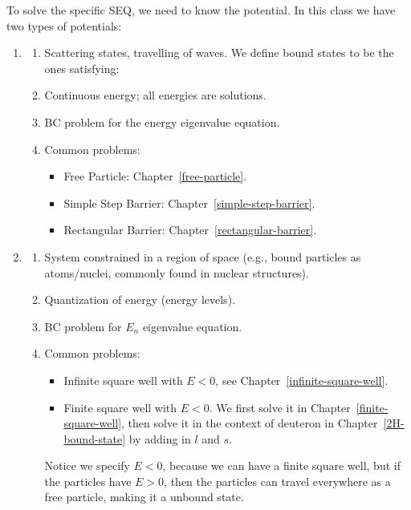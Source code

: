 \documentclass{school-22.101-notes}
\begin{document}
\clearpage
{}
To solve the specific SEQ, we need to know the potential. In this class we have two types of potentials:
\begin{enumerate}
\item {}
  \begin{enumerate}
  \item Scattering states, travelling of waves.  We define bound states to be the ones satisfying:
  \item Continuous energy; all energies are solutions. 
  \item BC problem for the energy eigenvalue equation. 
  \item Common problems:
    \begin{itemize}
    \item Free Particle: Chapter~\ref{free-particle}.
    \item Simple Step Barrier: Chapter~\ref{simple-step-barrier}.
    \item Rectangular Barrier: Chapter~\ref{rectangular-barrier}.
    \end{itemize}
  \end{enumerate}

  \item {}
    \begin{enumerate}
      \item System constrained in a region of space (e.g., bound particles as atoms/nuclei, commonly found in nuclear structures). 
      \item Quantization of energy (energy levels).
      \item BC problem for $E_n$ eigenvalue equation. 
      \item Common problems: 
        \begin{itemize}
        \item Infinite square well with $E<0$, see Chapter~\ref{infinite-square-well}. 
        \item Finite square well with $E<0$. We first solve it in Chapter~\ref{finite-square-well}, then solve it in the context of deuteron in Chapter~\ref{2H-bound-state} by adding in $l$ and $s$.
        \end{itemize}
        Notice we specify $E<0$, because we can have a finite square well, but if the particles have $E>0$, then the particles can travel everywhere as a free particle, making it a unbound state. 
    \end{enumerate}
\end{enumerate}
\end{document}
